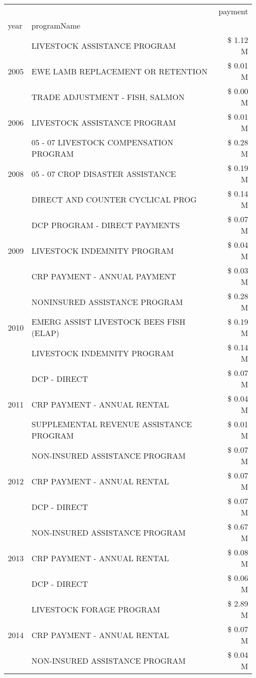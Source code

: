 \begin{tabular}{llr}
\toprule
 &  & payment \\
year & programName &  \\
\midrule
\multirow[t]{3}{*}{2005} & LIVESTOCK ASSISTANCE PROGRAM & \$ 1.12 M \\
 & EWE LAMB REPLACEMENT OR RETENTION & \$ 0.01 M \\
 & TRADE ADJUSTMENT - FISH, SALMON & \$ 0.00 M \\
\cline{1-3}
2006 & LIVESTOCK ASSISTANCE PROGRAM & \$ 0.01 M \\
\cline{1-3}
\multirow[t]{3}{*}{2008} & 05 - 07 LIVESTOCK COMPENSATION PROGRAM & \$ 0.28 M \\
 & 05 - 07 CROP DISASTER ASSISTANCE & \$ 0.19 M \\
 & DIRECT AND COUNTER CYCLICAL PROG & \$ 0.14 M \\
\cline{1-3}
\multirow[t]{3}{*}{2009} & DCP PROGRAM - DIRECT PAYMENTS & \$ 0.07 M \\
 & LIVESTOCK INDEMNITY PROGRAM & \$ 0.04 M \\
 & CRP PAYMENT - ANNUAL PAYMENT & \$ 0.03 M \\
\cline{1-3}
\multirow[t]{3}{*}{2010} & NONINSURED ASSISTANCE PROGRAM & \$ 0.28 M \\
 & EMERG ASSIST LIVESTOCK BEES FISH (ELAP) & \$ 0.19 M \\
 & LIVESTOCK INDEMNITY PROGRAM & \$ 0.14 M \\
\cline{1-3}
\multirow[t]{3}{*}{2011} & DCP - DIRECT & \$ 0.07 M \\
 & CRP PAYMENT - ANNUAL RENTAL & \$ 0.04 M \\
 & SUPPLEMENTAL REVENUE ASSISTANCE PROGRAM & \$ 0.01 M \\
\cline{1-3}
\multirow[t]{3}{*}{2012} & NON-INSURED ASSISTANCE PROGRAM & \$ 0.07 M \\
 & CRP PAYMENT - ANNUAL RENTAL & \$ 0.07 M \\
 & DCP - DIRECT & \$ 0.07 M \\
\cline{1-3}
\multirow[t]{3}{*}{2013} & NON-INSURED ASSISTANCE PROGRAM & \$ 0.67 M \\
 & CRP PAYMENT - ANNUAL RENTAL & \$ 0.08 M \\
 & DCP - DIRECT & \$ 0.06 M \\
\cline{1-3}
\multirow[t]{3}{*}{2014} & LIVESTOCK FORAGE PROGRAM & \$ 2.89 M \\
 & CRP PAYMENT - ANNUAL RENTAL & \$ 0.07 M \\
 & NON-INSURED ASSISTANCE PROGRAM & \$ 0.04 M \\

\end{tabular}
